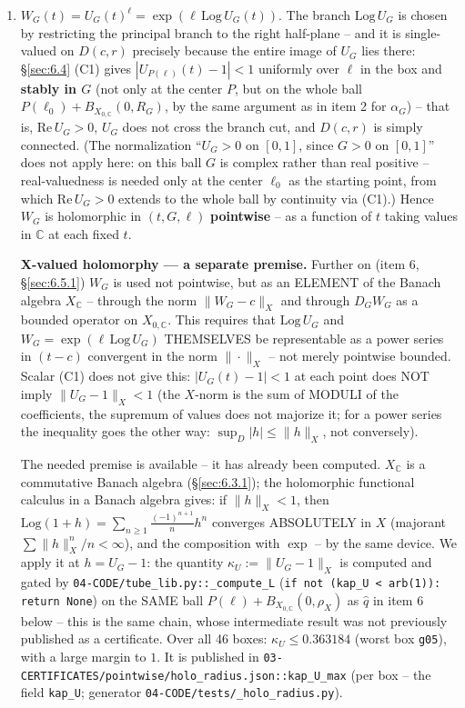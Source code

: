 \begin{enumerate}
\item[5.] \textbf{$W_G(t)=U_G(t)^{\ell}=\exp(\ell\,\mathrm{Log}\,U_G(t))$}. The branch $\mathrm{Log}\,U_G$ is chosen by restricting the principal branch to the right half-plane -- and it is single-valued on $D(c,r)$ precisely because the entire image of $U_G$ lies there: \S\ref{sec:6.4} (C1) gives $|U_{P(\ell)}(t)-1|<1$ uniformly over $\ell$ in the box and \textbf{stably in \boldmath$G$} (not only at the center $P$, but on the whole ball $P(\ell_0)+B_{X_{0,\mathbb C}}(0,R_G)$, by the same argument as in item 2 for $\alpha_G$) -- that is, $\mathrm{Re}\,U_G>0$, $U_G$ does not cross the branch cut, and $D(c,r)$ is simply connected. (The normalization ``$U_G>0$ on $[0,1]$, since $G>0$ on $[0,1]$'' does not apply here: on this ball $G$ is complex rather than real positive -- real-valuedness is needed only at the center $\ell_0$ as the starting point, from which $\mathrm{Re}\,U_G>0$ extends to the whole ball by continuity via (C1).) Hence $W_G$ is holomorphic in $(t,G,\ell)$ \textbf{pointwise} -- as a function of $t$ taking values in $\mathbb C$ at each fixed $t$.

   \textbf{X-valued holomorphy --- a separate premise.} Further on (item 6, \S\ref{sec:6.5.1}) $W_G$ is used not pointwise, but as an ELEMENT of the Banach algebra $X_{\mathbb C}$ -- through the norm $\|W_G-c\|_X$ and through $D_GW_G$ as a bounded operator on $X_{0,\mathbb C}$. This requires that $\mathrm{Log}\,U_G$ and $W_G=\exp(\ell\,\mathrm{Log}\,U_G)$ THEMSELVES be representable as a power series in $(t-c)$ convergent in the norm $\|\cdot\|_X$ -- not merely pointwise bounded. Scalar (C1) does not give this: $|U_G(t)-1|<1$ at each point does NOT imply $\|U_G-1\|_X<1$ (the $X$-norm is the sum of MODULI of the coefficients, the supremum of values does not majorize it; for a power series the inequality goes the other way: $\sup_D|h|\le\|h\|_X$, not conversely).

   The needed premise is available -- it has already been computed. $X_{\mathbb C}$ is a commutative Banach algebra (\S\ref{sec:6.3.1}); the holomorphic functional calculus in a Banach algebra gives: if $\|h\|_X<1$, then $\mathrm{Log}(1+h)=\sum_{n\ge1}\frac{(-1)^{n+1}}{n}h^n$ converges ABSOLUTELY in $X$ (majorant $\sum\|h\|_X^n/n<\infty$), and the composition with $\exp$ -- by the same device. We apply it at $h=U_G-1$: the quantity $\kappa_U:=\|U_G-1\|_X$ is computed and gated by \texttt{04-\allowbreak CODE/\allowbreak tube\_\allowbreak lib.py::\allowbreak \_\allowbreak compute\_\allowbreak L} (\texttt{if not (kap\_\allowbreak U < arb(1)): return None}) on the SAME ball $P(\ell)+B_{X_{0,\mathbb C}}(0,\rho_X)$ as $\hat q$ in item 6 below -- this is the same chain, whose intermediate result was not previously published as a certificate. Over all 46 boxes: $\kappa_U\le0.363184$ (worst box \texttt{g05}), with a large margin to $1$. It is published in \texttt{03-\allowbreak CERTIFICATES/\allowbreak pointwise/\allowbreak holo\_\allowbreak radius.json::\allowbreak kap\_\allowbreak U\_\allowbreak max} (per box -- the field \texttt{kap\_U}; generator \texttt{04-\allowbreak CODE/\allowbreak tests/\allowbreak \_\allowbreak holo\_\allowbreak radius.py}).


\end{enumerate}
